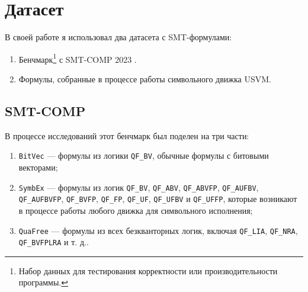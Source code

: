 


\section{Датасет}

В своей работе я использовал два датасета с SMT-формулами:

\begin{enumerate}
    \item Бенчмарк\footnote{Набор данных для тестирования корректности или производительности программы.} с SMT-COMP 2023 \cite{smt-comp-2023-benchmarks}.
    \item Формулы, собранные в процессе работы символьного движка USVM.
\end{enumerate}


\subsection{SMT-COMP}

В процессе исследований этот бенчмарк был поделен на три части:

\begin{enumerate}
    \item \texttt{BitVec} --- формулы из логики \texttt{QF\_BV}, обычные формулы с битовыми векторами;
    \item \texttt{SymbEx} --- формулы из логик \texttt{QF\_BV}, \texttt{QF\_ABV}, \texttt{QF\_ABVFP}, \texttt{QF\_AUFBV}, \\ \texttt{QF\_AUFBVFP}, \texttt{QF\_BVFP}, \texttt{QF\_FP}, \texttt{QF\_UF}, \texttt{QF\_UFBV} и \texttt{QF\_UFFP}, которые возникают в процессе работы любого движка для символьного исполнения;
    \item \texttt{QuaFree} --- формулы из всех безкванторных логик, включая \texttt{QF\_LIA}, \texttt{QF\_NRA}, \texttt{QF\_BVFPLRA} и т. д..
\end{enumerate}


